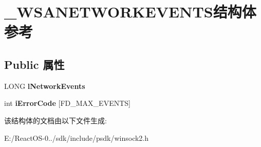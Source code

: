 \hypertarget{struct___w_s_a_n_e_t_w_o_r_k_e_v_e_n_t_s}{}\section{\+\_\+\+W\+S\+A\+N\+E\+T\+W\+O\+R\+K\+E\+V\+E\+N\+T\+S结构体 参考}
\label{struct___w_s_a_n_e_t_w_o_r_k_e_v_e_n_t_s}
\subsection*{Public 属性}
\begin{DoxyCompactItemize}
\item 
\mbox{\label{struct___w_s_a_n_e_t_w_o_r_k_e_v_e_n_t_s_a8fd747b1d137f6c91750325c850e0751}} 
L\+O\+NG {\bfseries l\+Network\+Events}
\item 
\mbox{\label{struct___w_s_a_n_e_t_w_o_r_k_e_v_e_n_t_s_ad6c8dea38277246a3816e86ab0d867ac}} 
int {\bfseries i\+Error\+Code} \mbox{[}F\+D\+\_\+\+M\+A\+X\+\_\+\+E\+V\+E\+N\+TS\mbox{]}
\end{DoxyCompactItemize}


该结构体的文档由以下文件生成\+:\begin{DoxyCompactItemize}
\item 
E\+:/\+React\+O\+S-\/0../sdk/include/psdk/winsock2.\+h\end{DoxyCompactItemize}
